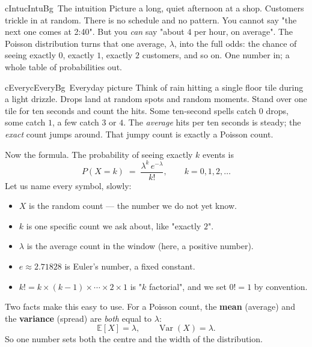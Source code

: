 \documentclass[a4paper,11pt]{article}
\newenvironment{intuitionbox}{%
  \begin{calloutbox}{cIntu}{cIntuBg}{\ding{43}\, The intuition}}{\end{calloutbox}}
\newenvironment{everydaybox}{%
  \begin{calloutbox}{cEvery}{cEveryBg}{\ding{72}\, Everyday picture}}{\end{calloutbox}}
\begin{document}
\begin{intuitionbox}
Picture a long, quiet afternoon at a shop. Customers trickle in at random.
There is no schedule and no pattern. You cannot say "the next one comes at
2:40". But you \emph{can} say "about $4$ per hour, on average". The Poisson
distribution turns that one average, $\lambda$, into the full odds: the chance
of seeing exactly $0$, exactly $1$, exactly $2$ customers, and so on. One
number in; a whole table of probabilities out.
\end{intuitionbox}

\begin{everydaybox}
Think of rain hitting a single floor tile during a light drizzle. Drops land at
random spots and random moments. Stand over one tile for ten seconds and count
the hits. Some ten-second spells catch $0$ drops, some catch $1$, a few catch
$3$ or $4$. The \emph{average} hits per ten seconds is steady; the
\emph{exact} count jumps around. That jumpy count is exactly a Poisson count.
\end{everydaybox}

Now the formula. The probability of seeing exactly $k$ events is
%
\begin{equation}
  P(X = k) \;=\; \frac{\lambda^{k}\, e^{-\lambda}}{k!},
  \qquad k = 0, 1, 2, \dots
  \label{eq:poisson}
\end{equation}
%
Let us name every symbol, slowly:
\begin{itemize}
  \item $X$ is the random count — the number we do not yet know.
  \item $k$ is one specific count we ask about, like "exactly $2$".
  \item $\lambda$ is the average count in the window (here, a positive number).
  \item $e \approx 2.71828$ is Euler's number, a fixed constant.
  \item $k! = k \times (k{-}1) \times \cdots \times 2 \times 1$ is "$k$
        factorial", and we set $0! = 1$ by convention.
\end{itemize}

\noindent Two facts make this easy to use. For a Poisson count, the
\textbf{mean} (average) and the \textbf{variance} (spread) are \emph{both} equal
to $\lambda$:
%
\begin{equation}
  \mathbb{E}[X] = \lambda,
  \qquad
  \operatorname{Var}(X) = \lambda .
  \label{eq:meanvar}
\end{equation}
%
So one number sets both the centre and the width of the distribution.
\end{document}
